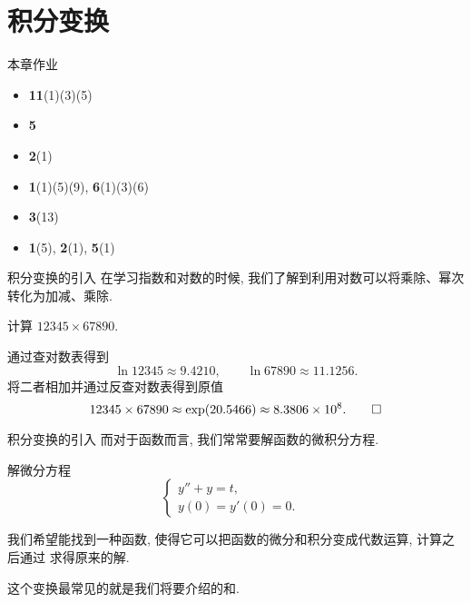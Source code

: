 \part{积分变换}


\begin{frame}[<*>]{本章作业}
\begin{itemize}
\item {} \textbf{11}(1)(3)(5)
\item {} \textbf{5}
\item {} \textbf{2}(1)
\item {} \textbf{1}(1)(5)(9), \textbf{6}(1)(3)(6)
\item {} \textbf{3}(13)
\item {} \textbf{1}(5), \textbf{2}(1), \textbf{5}(1)
\end{itemize}
\end{frame}


\begin{frame}{积分变换的引入}
\onslide<+->
在学习指数和对数的时候, 我们了解到利用对数可以将乘除、幂次转化为加减、乘除.
\begin{example}
计算 $12345\times 67890$.
\end{example}
\begin{solution}
通过查对数表得到
\[\ln 12345\approx 9.4210,\qquad\ln 67890\approx 11.1256.\]
\onslide<+->
将二者相加并通过反查对数表得到原值
\[12345\times 67890\approx \exp(20.5466)\approx 8.3806\times 10^8.\qedhere\]
\end{solution}
\end{frame}


\begin{frame}{积分变换的引入}
\onslide<+->
而对于函数而言, 我们常常要解函数的微积分方程.
\begin{example}
解微分方程
	\[\begin{cases}
		y''+y=t	,&\\
		y(0)=y'(0)=0.&
	\end{cases}\]
\end{example}
\begin{solutions}
\indent
我们希望能找到一种函数, 使得它可以把函数的微分和积分变成代数运算, 计算之后通过 求得原来的解.

\indent
\onslide<+->
这个变换最常见的就是我们将要介绍的和.
\end{solutions}
\end{frame}

